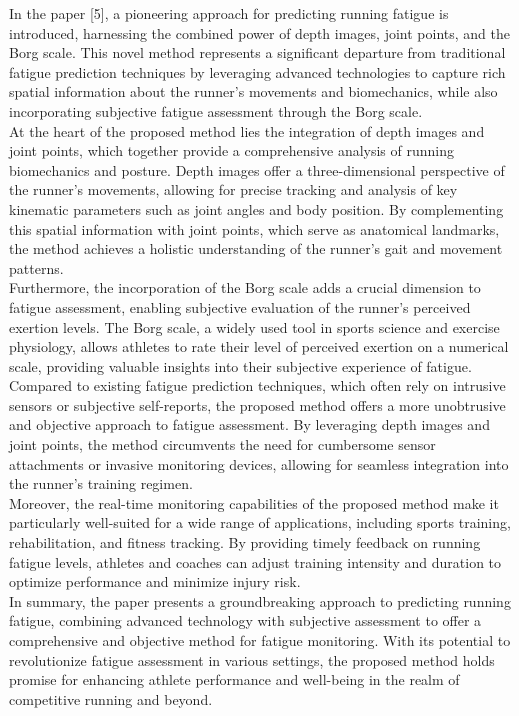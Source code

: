 \documentclass[12pt, English]{article}
\begin{document}
\begin{normalsize}
In the paper [5], a pioneering approach for predicting running fatigue is introduced, harnessing the combined power of depth images, joint points, and the Borg scale. This novel method represents a significant departure from traditional fatigue prediction techniques by leveraging advanced technologies to capture rich spatial information about the runner's movements and biomechanics, while also incorporating subjective fatigue assessment through the Borg scale.\\
At the heart of the proposed method lies the integration of depth images and joint points, which together provide a comprehensive analysis of running biomechanics and posture. Depth images offer a three-dimensional perspective of the runner's movements, allowing for precise tracking and analysis of key kinematic parameters such as joint angles and body position. By complementing this spatial information with joint points, which serve as anatomical landmarks, the method achieves a holistic understanding of the runner's gait and movement patterns.\\
Furthermore, the incorporation of the Borg scale adds a crucial dimension to fatigue assessment, enabling subjective evaluation of the runner's perceived exertion levels. The Borg scale, a widely used tool in sports science and exercise physiology, allows athletes to rate their level of perceived exertion on a numerical scale, providing valuable insights into their subjective experience of fatigue.\\
Compared to existing fatigue prediction techniques, which often rely on intrusive sensors or subjective self-reports, the proposed method offers a more unobtrusive and objective approach to fatigue assessment. By leveraging depth images and joint points, the method circumvents the need for cumbersome sensor attachments or invasive monitoring devices, allowing for seamless integration into the runner's training regimen.\\
Moreover, the real-time monitoring capabilities of the proposed method make it particularly well-suited for a wide range of applications, including sports training, rehabilitation, and fitness tracking. By providing timely feedback on running fatigue levels, athletes and coaches can adjust training intensity and duration to optimize performance and minimize injury risk.\\
In summary, the paper presents a groundbreaking approach to predicting running fatigue, combining advanced technology with subjective assessment to offer a comprehensive and objective method for fatigue monitoring. With its potential to revolutionize fatigue assessment in various settings, the proposed method holds promise for enhancing athlete performance and well-being in the realm of competitive running and beyond.
\\


\end{normalsize}
\end{document}
